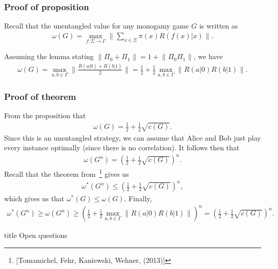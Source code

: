 \documentclass{beamer}
\newcommand{\tinyspace}{\mspace{1mu}}
\newcommand{\norm}[1]{\lVert\tinyspace #1 \tinyspace\rVert}
\newcommand{\biggnorm}[1]{\biggl\lVert\tinyspace #1 \tinyspace\biggr\rVert}
\begin{document}
\begin{frame} 
	\frametitle{Proof of proposition}
	Recall that the unentangled value for any monogamy game $G$ is written as 
	\begin{align*}
		\omega(G) = \max_{f : \Sigma \rightarrow \Gamma} \biggnorm{ \sum_{x \in \Sigma} \pi(x) R(f(x)|x) }.
	\end{align*}			
	\vspace{2mm}
	
	Assuming the lemma stating $\norm{\Pi_0 + \Pi_1} = 1 + \norm{\Pi_0 \Pi_1}$, we have 
	\begin{align*}
		\omega(G) = \max_{a,b \in \Gamma} \biggnorm{ \frac{R(a|0) + R(b|1)}{2} } = \frac{1}{2} + \frac{1}{2} \max_{a,b \in \Gamma} \biggnorm{R(a|0) R(b|1)}.
	\end{align*}
\end{frame}

\begin{frame} 
	\frametitle{Proof of theorem}
	From the proposition that
	\begin{align*}
		\omega(G) = \frac{1}{2} + \frac{1}{2} \sqrt{c(G)}. 
	\end{align*}
	\pause
	Since this is an unentangled strategy, we can assume that Alice and Bob just play every instance optimally (since there is no correlation). It follows then that
	\begin{align}
		\omega(G^n) = \left( \frac{1}{2} + \frac{1}{2} \sqrt{c(G)} \right)^n. 
	\end{align}
	\pause
	Recall that the theorem from~\footnote{[Tomamichel, Fehr, Kaniewski, Wehner, (2013)]} gives us
	\begin{align*}
		\omega^*(G^n) \leq \left( \frac{1}{2} + \frac{1}{2} \sqrt{c(G)} \right)^n,
	\end{align*}
	which gives us that $\omega^*(G) \leq \omega(G)$. 
	\pause
	Finally,
	\small{
	\begin{align*}
		\omega^*(G^n) \geq \omega(G^n) \geq \left( \frac{1}{2} + \frac{1}{2} \max_{a,b \in \Gamma} \biggnorm{R(a|0)R(b|1)} \right)^n = \left( \frac{1}{2} + \frac{1}{2} \sqrt{c(G)} \right)^n.
	\end{align*}
	}
\end{frame}

\begin{frame}[noframenumbering]
  \vfill
  \centering
  \begin{beamercolorbox}[sep=8pt,center,shadow=true,rounded=true]{title}
     Open questions
  \end{beamercolorbox}
  \vfill
  \end{frame}
\end{document}

